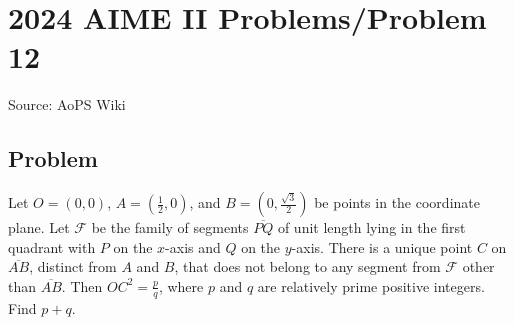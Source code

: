 \documentclass[12pt]{article}
\begin{document}
\section*{{2024 AIME II Problems/Problem 12}}
Source: AoPS Wiki

\subsection*{Problem}
Let \(O=(0,0)\), \(A=\left(\tfrac{1}{2},0\right)\), and \(B=\left(0,\tfrac{\sqrt{3}}{2}\right)\) be points in the coordinate plane. Let \(\mathcal{F}\) be the family of segments \(\overline{PQ}\) of unit length lying in the first quadrant with \(P\) on the \(x\)-axis and \(Q\) on the \(y\)-axis. There is a unique point \(C\) on \(\overline{AB}\), distinct from \(A\) and \(B\), that does not belong to any segment from \(\mathcal{F}\) other than \(\overline{AB}\). Then \(OC^2=\tfrac{p}{q}\), where \(p\) and \(q\) are relatively prime positive integers. Find \(p+q\).
\end{document}
